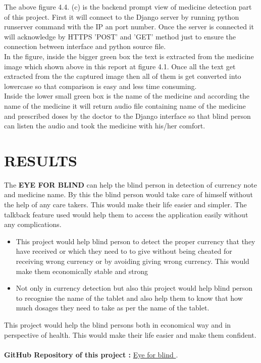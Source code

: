\noindent The above figure 4.4. (c) is the backend prompt view of medicine detection part of this project. First it will connect to the Django server by running python runserver command with the IP an port number. Once the server is connected it will acknowledge by HTTPS 'POST' and 'GET' method just to ensure the connection between interface and python source file.\\
\newpage
\noindent In the figure, inside the bigger green box the text is extracted from the medicine image which shown above in this report at figure 4.1. Once all the text get extracted from the the captured image then all of them is get converted into lowercase so that comparison is easy and less time consuming.\\Inside the lower small green box is the name of the medicine and according the name of the medicine it will return audio file containing name of the medicine and prescribed doses by the doctor to the Django interface so that blind person can listen the audio and took the medicine with his/her comfort.
\newpage
\chapter{RESULTS}
\noindent The {\bf EYE FOR BLIND} can help the blind person in detection of currency note and medicine name. By  this the blind person would take care of himself without the help of any care takers. This would make their life easier and simpler. The talkback feature used would help them to access the application easily without any complications.
\begin{itemize}
	\item This project would help blind person to detect the proper currency that they have received or which they need to to give without being cheated for receiving wrong currency or by avoiding giving wrong currency. This would make them economically stable and strong
	\item Not only in currency detection but also this project would help blind person to recognise the name of the tablet and also help them to know that how much  dosages they need to take as per the name of the tablet.
\end{itemize}
\noindent This project would help the blind persons both in economical way and in perspective of health. This would make their life easier and make them confident.\\\\ \textbf{\Large GitHub Repository of this project :} \href{https://github.com/mastersumant/mini_project}{\Large \color{blue} Eye for blind }.
